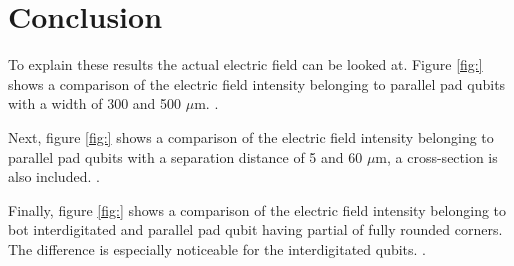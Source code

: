 \section{Conclusion}
To explain these results the actual electric field can be looked at. Figure \ref{fig:} shows a comparison of the electric field intensity belonging to parallel pad qubits with a width of 300 and 500 \(\mu\)m. .
 
Next, figure \ref{fig:} shows a comparison of the electric field intensity belonging to parallel pad qubits with a separation distance of 5 and 60 \(\mu\)m, a cross-section is also included. .
 
Finally, figure \ref{fig:} shows a comparison of the electric field intensity belonging to bot interdigitated and parallel pad qubit having partial of fully rounded corners. The difference is especially noticeable for the interdigitated qubits. .
  




    
